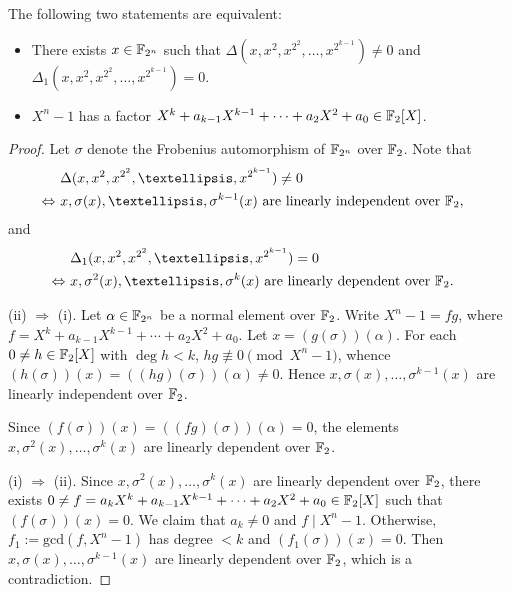 \documentclass[10pt,a4paper]{amsart}
\newcommand{\f}{\Bbb F}
\begin{document}
\begin{thm}\label{T2.1}
The following two statements are equivalent:
\begin{itemize}
\item[(i)] There exists $x\in\f_{2^n}$ such that $\Delta(x,x^2,x^{2^2},\dots,x^{2^{k-1}})\ne0$ and\\ $\Delta_1(x,x^2,x^{2^2},\dots,x^{2^{k-1}})=0$.

\item[(ii)] $X^n-1$ has a factor $X^k+a_{k-1}X^{k-1}+\cdots+a_2X^2+a_0\in\f_2[X]$.
\end{itemize}
\end{thm}

\begin{proof}
Let $\sigma$ denote the Frobenius automorphism  of $\f_{2^n}$ over $\f_2$. Note that 
\begin{align*}
&\Delta(x,x^2,x^{2^2},\dots,x^{2^{k-1}})\ne0\cr
\Leftrightarrow\ &x,\sigma(x),\dots,\sigma^{k-1}(x)\ \text{are linearly independent over}\ \f_2,
\end{align*}
and 
\begin{align*}
&\Delta_1(x,x^2,x^{2^2},\dots,x^{2^{k-1}})=0\cr
\Leftrightarrow\ &x,\sigma^2(x),\dots,\sigma^{k}(x)\ \text{are linearly dependent over}\ \f_2.
\end{align*}

\medskip
(ii) $\Rightarrow$ (i). Let $\alpha\in\f_{2^n}$ be a normal element over $\f_2$. Write $X^n-1=fg$, where $f=X^k+a_{k-1}X^{k-1}+\cdots+a_2X^2+a_0$. Let $x=(g(\sigma))(\alpha)$. For each $0\ne h\in\f_2[X]$ with $\deg h<k$, $hg\not\equiv 0\pmod{X^n-1}$, whence $(h(\sigma))(x)=((hg)(\sigma))(\alpha)\ne 0$. Hence $x,\sigma(x),\dots,\sigma^{k-1}(x)$ are linearly independent over $\f_2$. 

Since $(f(\sigma))(x)=((fg)(\sigma))(\alpha)=0$, the elements $x,\sigma^2(x),\dots,\sigma^k(x)$ are linearly dependent over $\f_2$.

\medskip
(i) $\Rightarrow$ (ii). Since $x,\sigma^2(x),\dots,\sigma^k(x)$ are linearly dependent over $\f_2$, there exists $0\ne f=a_kX^k+a_{k-1}X^{k-1}+\cdots+a_2X^2+a_0\in\f_2[X]$ such that $(f(\sigma))(x)=0$. We claim that $a_k\ne0$ and $f\mid X^n-1$. Otherwise, $f_1:=\text{gcd}(f,X^n-1)$ has degree $<k$ and $(f_1(\sigma))(x)=0$. Then $x,\sigma(x),\dots,\sigma^{k-1}(x)$ are linearly dependent over $\f_2$, which is a contradiction. 
\end{proof}
\end{document}
